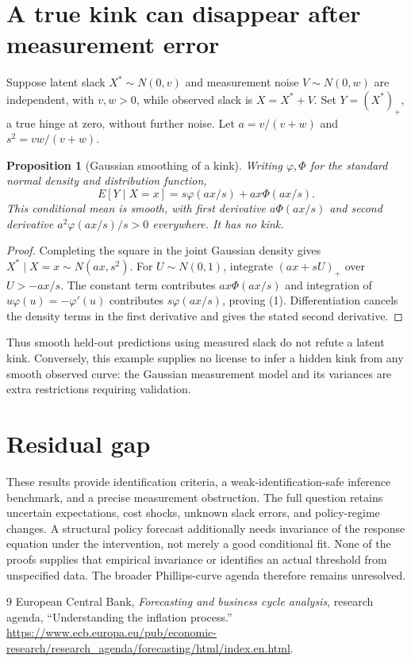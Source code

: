 \documentclass[11pt]{article}
\newtheorem{proposition}[theorem]{Proposition}
\theoremstyle{definition}
\begin{document}
\section*{A true kink can disappear after measurement error}
Suppose latent slack $X^*\sim N(0,v)$ and measurement noise $V\sim N(0,w)$ are independent, with $v,w>0$, while observed slack is $X=X^*+V$. Set $Y=(X^*)_+$, a true hinge at zero, without further noise. Let $a=v/(v+w)$ and $s^2=vw/(v+w)$.
\begin{proposition}[Gaussian smoothing of a kink]
Writing $\varphi,\Phi$ for the standard normal density and distribution function,
\[
 E[Y\mid X=x]=s\varphi(ax/s)+ax\Phi(ax/s).
 \tag{1}
\]
This conditional mean is smooth, with first derivative $a\Phi(ax/s)$ and second derivative $a^2\varphi(ax/s)/s>0$ everywhere. It has no kink.
\end{proposition}
\begin{proof}
Completing the square in the joint Gaussian density gives $X^*\mid X=x\sim N(ax,s^2)$. For $U\sim N(0,1)$, integrate $(ax+sU)_+$ over $U>-ax/s$. The constant term contributes $ax\Phi(ax/s)$ and integration of $u\varphi(u)=-\varphi'(u)$ contributes $s\varphi(ax/s)$, proving (1). Differentiation cancels the density terms in the first derivative and gives the stated second derivative.
\end{proof}
Thus smooth held-out predictions using measured slack do not refute a latent kink. Conversely, this example supplies no license to infer a hidden kink from any smooth observed curve: the Gaussian measurement model and its variances are extra restrictions requiring validation.

\section*{Residual gap}
These results provide identification criteria, a weak-identification-safe inference benchmark, and a precise measurement obstruction. The full question retains uncertain expectations, cost shocks, unknown slack errors, and policy-regime changes. A structural policy forecast additionally needs invariance of the response equation under the intervention, not merely a good conditional fit. None of the proofs supplies that empirical invariance or identifies an actual threshold from unspecified data. The broader Phillips-curve agenda therefore remains unresolved.

\begin{thebibliography}{9}
 European Central Bank, \emph{Forecasting and business cycle analysis}, research agenda, ``Understanding the inflation process.'' \url{https://www.ecb.europa.eu/pub/economic-research/research_agenda/forecasting/html/index.en.html}.
\end{thebibliography}
\end{document}
